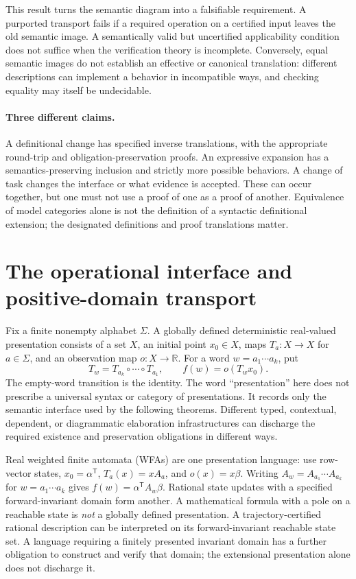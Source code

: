 \documentclass[11pt]{article}
\theoremstyle{definition}
\begin{document}
This result turns the semantic diagram into a falsifiable requirement. A
purported transport fails if a required operation on a certified input leaves
the old semantic image. A semantically valid but uncertified applicability
condition does not suffice when the verification theory is incomplete.
Conversely, equal semantic images do not establish an effective or
canonical translation: different descriptions can implement a behavior in
incompatible ways, and checking equality may itself be undecidable.

\paragraph{Three different claims.}
A definitional change has specified inverse translations, with the appropriate
round-trip and obligation-preservation proofs. An expressive expansion has a
semantics-preserving inclusion and strictly more possible behaviors. A change
of task changes the interface or what evidence is accepted. These can occur
together, but one must not use a proof of one as a proof of another.
Equivalence of model categories alone is not the definition of a syntactic
definitional extension; the designated definitions and proof translations
matter.

\section{The operational interface and positive-domain transport}
\label{sec:operational}

Fix a finite nonempty alphabet $\Sigma$. A globally defined deterministic
real-valued presentation consists of a set $X$, an initial point $x_0\in X$,
maps $T_a:X\to X$ for $a\in\Sigma$, and an observation map $o:X\to\mathbb R$.
For a word $w=a_1\cdots a_k$, put
\[
 T_w=T_{a_k}\circ\cdots\circ T_{a_1},\qquad
 f(w)=o(T_wx_0).
\]
The empty-word transition is the identity. The word ``presentation'' here
does not prescribe a universal syntax or category of presentations. It
records only the semantic interface used by the following theorems.
Different typed, contextual, dependent, or diagrammatic elaboration
infrastructures can discharge the required existence and preservation
obligations in different ways.

Real weighted finite automata (WFAs) are one presentation language: use
row-vector states, $x_0=\alpha^{\mathsf T}$, $T_a(x)=xA_a$, and
$o(x)=x\beta$. Writing $A_w=A_{a_1}\cdots A_{a_k}$ for
$w=a_1\cdots a_k$ gives $f(w)=\alpha^{\mathsf T}A_w\beta$. Rational state updates with a specified
forward-invariant domain form another. A mathematical formula with a pole
on a reachable state is \emph{not} a globally defined presentation.
A trajectory-certified rational description can be interpreted on its
forward-invariant reachable state set. A language requiring a finitely
presented invariant domain has a further obligation to construct and verify
that domain; the extensional presentation alone does not discharge it.
\end{document}
